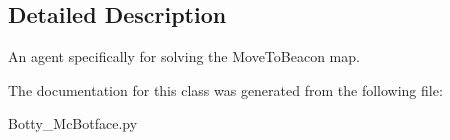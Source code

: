\subsection{Detailed Description}
\begin{DoxyVerb}An agent specifically for solving the MoveToBeacon map.\end{DoxyVerb}
 

The documentation for this class was generated from the following file\+:\begin{DoxyCompactItemize}
\item 
Botty\+\_\+\+Mc\+Botface.\+py\end{DoxyCompactItemize}

